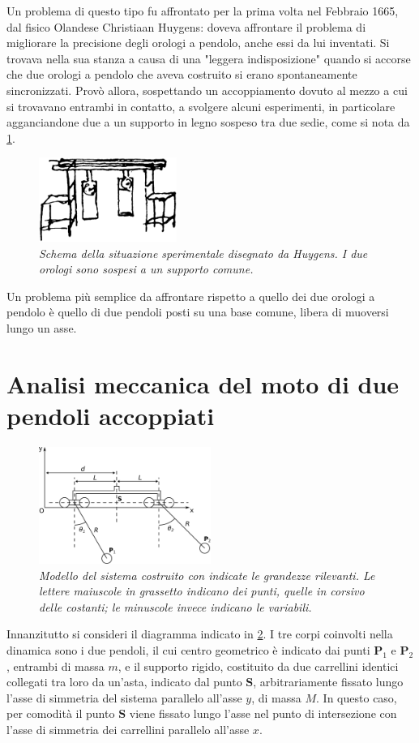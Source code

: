 \documentclass[11pt, a4paper, twoside, italian]{article}
\begin{document}
Un problema di questo tipo fu affrontato per la prima volta nel Febbraio 1665, dal fisico Olandese Christiaan Huygens: doveva affrontare il problema di migliorare la precisione degli orologi a pendolo, anche essi da lui inventati. Si trovava nella sua stanza a causa di una "leggera indisposizione" quando si accorse che due orologi a pendolo che aveva costruito si erano spontaneamente sincronizzati. Provò allora, sospettando un accoppiamento dovuto al mezzo a cui si trovavano entrambi in contatto, a svolgere alcuni esperimenti, in particolare agganciandone due a un supporto in legno sospeso tra due sedie, come si nota da \cref{pendoli_huygens}.
\begin{figure}
    \centering
    \includegraphics[width=0.4\textwidth]{../../media/img/pendolums.png}
    \caption{\textit{Schema della situazione sperimentale disegnato da Huygens. I due orologi sono sospesi a un supporto comune.}}
    \label{pendoli_huygens}
\end{figure}
Un problema più semplice da affrontare rispetto a quello dei due orologi a pendolo è quello di due pendoli posti su una base comune, libera di muoversi lungo un asse.
\section{Analisi meccanica del moto di due pendoli accoppiati}
\begin{figure}[h]
    \centering
    \includegraphics[width=0.5\textwidth]{../../media/cad/sketch_2.pdf}
    \caption{\textit{Modello del sistema costruito con indicate
     le grandezze rilevanti. Le lettere maiuscole in grassetto indicano dei punti, quelle in corsivo delle 
     costanti; le minuscole invece indicano le variabili.} }
    \label{pendolicorpolibero}
\end{figure}
Innanzitutto si consideri il diagramma indicato in \cref{pendolicorpolibero}.
I tre corpi coinvolti nella dinamica sono i due pendoli, il cui centro 
geometrico è indicato dai punti $\mathbf{P}_1$ e $\mathbf{P}_2$, entrambi di massa $m$,
e il supporto rigido, costituito da due carrellini identici collegati tra loro da un'asta,
indicato dal punto $\mathbf{S}$, arbitrariamente fissato lungo l'asse di simmetria del sistema 
parallelo all'asse $y$, di massa $M$. In questo caso, per comodità il punto $\mathbf{S}$ 
viene fissato lungo l'asse nel punto di intersezione con l'asse di simmetria dei carrellini
parallelo all'asse $x$.
\end{document}
